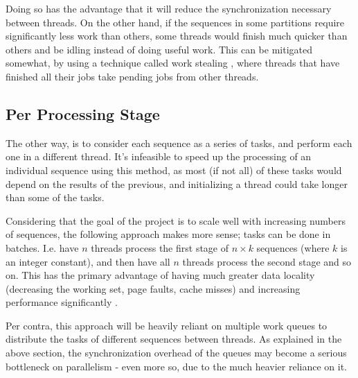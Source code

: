  Doing so has the advantage that it will reduce the synchronization necessary between threads. On the other hand, if the sequences in some partitions require significantly less work than others, some threads would finish much quicker than others and be idling instead of doing useful work. This can be mitigated somewhat, by using a technique called work stealing \autocite{workstealing}, where threads that have finished all their jobs take pending jobs from other threads.

\subsection{Per Processing Stage}

The other way, is to consider each sequence as a series of tasks, and perform each one in a different thread. It's infeasible to speed up the processing of an individual sequence using this method, as most (if not all) of these tasks would depend on the results of the previous, and initializing a thread could take longer than some of the tasks.

Considering that the goal of the project is to scale well with increasing numbers of sequences, the following approach makes more sense; tasks can be done in batches. I.e. have $n$ threads process the first stage of $n\times k$ sequences (where $k$ is an integer constant), and then have all $n$ threads process the second stage and so on. This has the primary advantage of having much greater data locality (decreasing the working set, page faults, cache misses) and increasing performance significantly \autocite{locality}.

Per contra, this approach will be heavily reliant on multiple work queues to distribute the tasks of different sequences between threads. As explained in the above section, the synchronization overhead of the queues may become a serious bottleneck on parallelism - even more so, due to the much heavier reliance on it.

